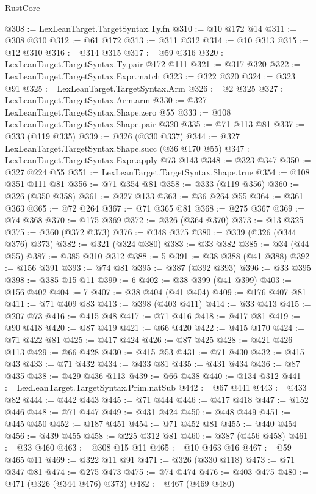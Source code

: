\begin{lexlean}{RustCore}
\begin{coremodule}
@308 := LexLeanTarget.TargetSyntax.Ty.fn
@310 := @10 @172 @14
@311 := @308 @310
@312 := @61 @172
@313 := @311 @312
@314 := @10 @313
@315 := @12 @310
@316 := @314 @315
@317 := @59 @316
@320 := LexLeanTarget.TargetSyntax.Ty.pair @172 @111
@321 := @317 @320
@322 := LexLeanTarget.TargetSyntax.Expr.match
@323 := @322 @320
@324 := @323 @91
@325 := LexLeanTarget.TargetSyntax.Arm
@326 := @2 @325
@327 := LexLeanTarget.TargetSyntax.Arm.arm
@330 := @327 LexLeanTarget.TargetSyntax.Shape.zero @55
@333 := @108 LexLeanTarget.TargetSyntax.Shape.pair @320
@335 := @71 @113 @81
@337 := @333 (@119 @335)
@339 := @326 (@330 @337)
@344 := @327 LexLeanTarget.TargetSyntax.Shape.succ (@36 @170 @55)
@347 := LexLeanTarget.TargetSyntax.Expr.apply @73 @143
@348 := @323 @347
@350 := @327 @224 @55
@351 := LexLeanTarget.TargetSyntax.Shape.true
@354 := @108 @351 @111 @81
@356 := @71 @354 @81
@358 := @333 (@119 @356)
@360 := @326 (@350 @358)
@361 := @327 @133
@363 := @36 @264 @55
@364 := @361 @363
@365 := @72 @264
@367 := @71 @365 @81
@368 := @275 @367
@369 := @74 @368
@370 := @175 @369
@372 := @326 (@364 @370)
@373 := @13 @325
@375 := @360 (@372 @373)
@376 := @348 @375
@380 := @339 (@326 (@344 @376) @373)
@382 := @321 (@324 @380)
@383 := @33 @382
@385 := @34 (@44 @55)
@387 := @385 @310 @312
@388 := 5
@391 := @38 @388 (@41 @388)
@392 := @156 @391
@393 := @74 @81
@395 := @387 (@392 @393)
@396 := @33 @395
@398 := @385 @15 @11
@399 := 6
@402 := @38 @399 (@41 @399)
@403 := @156 @402
@404 := 7
@407 := @38 @404 (@41 @404)
@409 := @176 @407 @81
@411 := @71 @409 @83
@413 := @398 (@403 @411)
@414 := @33 @413
@415 := @207 @73
@416 := @415 @48
@417 := @71 @416
@418 := @417 @81
@419 := @90 @418
@420 := @87 @419
@421 := @66 @420
@422 := @415 @170
@424 := @71 @422 @81
@425 := @417 @424
@426 := @87 @425
@428 := @421 @426 @113
@429 := @66 @428
@430 := @415 @53
@431 := @71 @430
@432 := @415 @43
@433 := @71 @432
@434 := @433 @81
@435 := @431 @434
@436 := @87 @435
@438 := @429 @436 @113
@439 := @66 @438
@440 := @134 @312
@441 := LexLeanTarget.TargetSyntax.Prim.natSub
@442 := @67 @441
@443 := @433 @82
@444 := @442 @443
@445 := @71 @444
@446 := @417 @418
@447 := @152 @446
@448 := @71 @447
@449 := @431 @424
@450 := @448 @449
@451 := @445 @450
@452 := @187 @451
@454 := @71 @452 @81
@455 := @440 @454
@456 := @439 @455
@458 := @225 @312 @81
@460 := @387 (@456 @458)
@461 := @33 @460
@463 := @308 @15 @11
@465 := @10 @463 @16
@467 := @59 @465 @11
@469 := @322 @11 @91
@471 := @326 (@330 @118)
@473 := @71 @347 @81
@474 := @275 @473
@475 := @74 @474
@476 := @403 @475
@480 := @471 (@326 (@344 @476) @373)
@482 := @467 (@469 @480)

\end{coremodule}
\end{lexlean}
